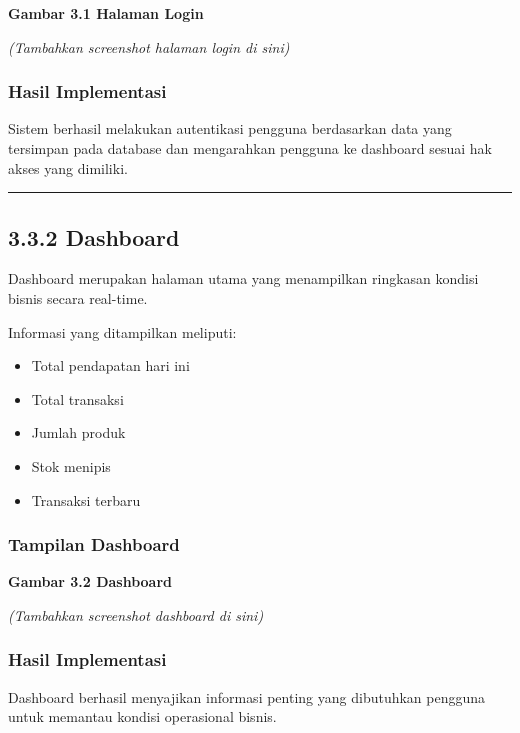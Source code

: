 \textbf{Gambar 3.1 Halaman Login}

\emph{(Tambahkan screenshot halaman login di sini)}

\subsubsection{Hasil Implementasi}\label{hasil-implementasi}

Sistem berhasil melakukan autentikasi pengguna berdasarkan data yang tersimpan pada database dan mengarahkan pengguna ke dashboard sesuai hak akses yang dimiliki.

\begin{center}\rule{0.5\linewidth}{0.5pt}\end{center}

\subsection{3.3.2 Dashboard}\label{dashboard-1}

Dashboard merupakan halaman utama yang menampilkan ringkasan kondisi bisnis secara real-time.

Informasi yang ditampilkan meliputi:

\begin{itemize}
\tightlist
\item
  Total pendapatan hari ini
\item
  Total transaksi
\item
  Jumlah produk
\item
  Stok menipis
\item
  Transaksi terbaru
\end{itemize}

\subsubsection{Tampilan Dashboard}\label{tampilan-dashboard}

\textbf{Gambar 3.2 Dashboard}

\emph{(Tambahkan screenshot dashboard di sini)}

\subsubsection{Hasil Implementasi}\label{hasil-implementasi-1}

Dashboard berhasil menyajikan informasi penting yang dibutuhkan pengguna untuk memantau kondisi operasional bisnis.


